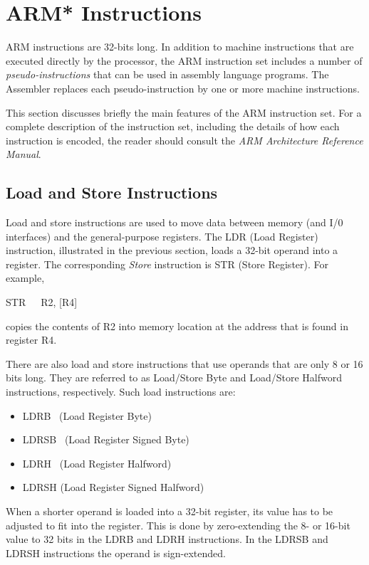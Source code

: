 \documentclass[11pt, twoside, pdftex]{article}
\begin{document}
\section{ARM* Instructions}
\label{sec:ARM_inst}

ARM instructions are 32-bits long. In addition to machine instructions that are executed 
directly by the processor, the ARM instruction set includes a number of
{\it pseudo-instructions} that can be used in assembly language
programs. The Assembler replaces each pseudo-instruction by one 
or more machine instructions.

This section discusses briefly the main features of the ARM instruction set. For a complete description of the instruction
set, including the details of how each instruction is encoded,
the reader should consult the 
{\it ARM Architecture Reference Manual}.

\subsection{Load and Store Instructions}
\label{sec:load_store}

Load and store instructions are used to move data between memory
(and I/0 interfaces) and the general-purpose registers. 
The LDR (Load Register) instruction, illustrated in the previous
section, loads a 32-bit operand into a register. 
The corresponding {\it Store} instruction is STR (Store Register). 
For example,
\begin{center}
STR~~~R2, [R4]
\end{center}
\noindent
copies the contents of R2 into memory location at the address
that is found in register R4.

There are also load and store instructions that use operands that are only 8 or 16 bits long.
They are referred to as Load/Store Byte and Load/Store Halfword instructions, respectively.
Such load instructions are: 
\begin{itemize}
\item LDRB~ (Load Register Byte)
\item LDRSB~ (Load Register Signed Byte)
\item LDRH~ (Load Register Halfword)
\item LDRSH (Load Register Signed Halfword)
\end{itemize}
\noindent
When a shorter operand is loaded into a 32-bit register, its value has to be adjusted to fit into the register. This is done by zero-extending the 8- or 16-bit value to 32 bits
in the LDRB and LDRH instructions. In the LDRSB and LDRSH
instructions the operand is sign-extended.
 
\end{document}
